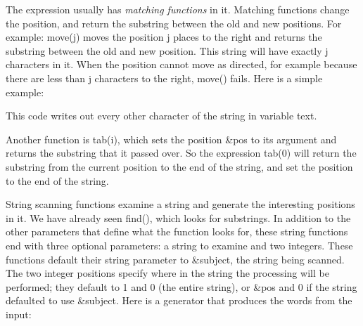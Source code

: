 The expression usually has \textit{matching
functions} in it. Matching functions change the position, and return
the substring between the old and new positions. For example:
\textsf{move(j)}\textsf{ }moves the position \textsf{j} places to the
right and returns the substring between the old and new position. This
string will have exactly \textsf{j} characters in it. When the position
cannot move as directed, for example because there are less than
\textsf{j} characters to the right, \textsf{move()}
fails. Here is a simple example:


This code writes out every other character of the string in variable
\textsf{text}.

Another function is \textsf{tab(i)}, which sets the
position \textsf{\&pos} to its argument and returns the substring that
it passed over. So the expression \textsf{tab(0)} will return the
substring from the current position to the end of the string, and set
the position to the end of the string.

String scanning functions examine a string and generate the interesting
positions in it. We have already seen \textsf{find()},
which looks for substrings. In addition to the other parameters that
define what the function looks for, these string functions end with
three optional parameters: a string to examine and two integers. These
functions default their string
parameter to \textsf{\&subject}, the string being scanned. The two
integer positions specify where in the string the processing will be
performed; they default to 1 and 0 (the entire string), or
\textsf{\&pos} and 0 if the string defaulted to use \textsf{\&subject}.
Here is a generator that produces the words from the
input:


